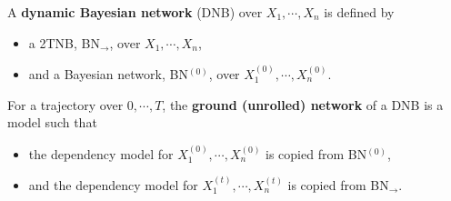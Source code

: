 \documentclass[11pt]{article}
\begin{document}
	\begin{definition}
		A \textbf{dynamic Bayesian network} (DNB) over $X_1, \cdots, X_n$ is defined by
		\begin{itemize}
			\item a 2TNB, BN$_{\rightarrow}$, over $X_1, \cdots, X_n$,
			\item and a Bayesian network, BN$^{(0)}$, over $X_1^{(0)}, \cdots, X_n^{(0)}$.
		\end{itemize}
	\end{definition}
	
	\begin{definition}
		For a trajectory over $0, \cdots, T$, the \textbf{ground (unrolled) network} of a DNB is a model such that
		\begin{itemize}
			\item the dependency model for $X_1^{(0)}, \cdots, X_n^{(0)}$ is copied from BN$^{(0)}$,
			\item and the dependency model for $X_1^{(t)}, \cdots, X_n^{(t)}$ is copied from BN$_{\rightarrow}$.
		\end{itemize}
	\end{definition}
\end{document}
